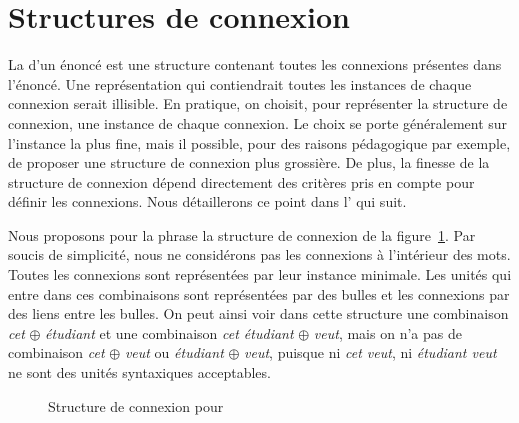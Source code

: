 \section{Structures de connexion}\label{sec:3.2-structure}\label{sec:3.2.18}\label{sec:3.2.19}
La  d'un énoncé est une structure contenant toutes les connexions présentes dans l'énoncé. Une représentation qui contiendrait tou\-tes les instances de chaque connexion serait illisible. En pratique, on choisit, pour représenter la structure de connexion, une instance de chaque connexion. Le choix se porte généralement sur l'instance la plus fine, mais il possible, pour des raisons pédagogique par exemple, de proposer une structure de connexion plus grossière. De plus, la finesse de la structure de connexion dépend directement des critères pris en compte pour définir les connexions. Nous détaillerons ce point dans l' qui suit.

Nous proposons pour la phrase  la structure de connexion de la figure~\ref{fig:livredesyntaxe}. Par soucis de simplicité, nous ne considérons pas les connexions à l'intérieur des mots. Toutes les connexions sont représentées par leur instance minimale. Les unités qui entre dans ces combinaisons sont représentées par des bulles et les connexions par des liens entre les bulles. On peut ainsi voir dans cette structure une combinaison \textit{cet} ${\oplus}$ \textit{étudiant} et une combinaison \textit{cet étudiant} ${\oplus}$ \textit{veut}, mais on n'a pas de combinaison \textit{cet} ${\oplus}$ \textit{veut} ou \textit{étudiant} ${\oplus}$ \textit{veut}, puisque ni \textit{cet veut}, ni \textit{étudiant veut} ne sont des unités syntaxiques acceptables.

\begin{figure}
\caption{\label{fig:livredesyntaxe}Structure de connexion pour }
\end{figure}

